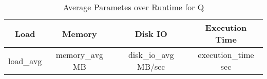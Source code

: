 \documentclass[../../main.tex]{subfiles}
\begin{document}
    \begin{table}
        \begin{center}
            \begin{tabular}{ |c|c|c|c| } 
            \hline
            Load & Memory & Disk IO & Execution Time\\
            \hline
            {load_avg} & {memory_avg} MB & {disk_io_avg} MB/sec & {execution_time} sec \\
            \hline
            \end{tabular}
            \\[1pt]
            \caption{Average Parametes over Runtime for {Q}}
        \end{center}
    \end{table}
    \pagebreak
\end{document}
